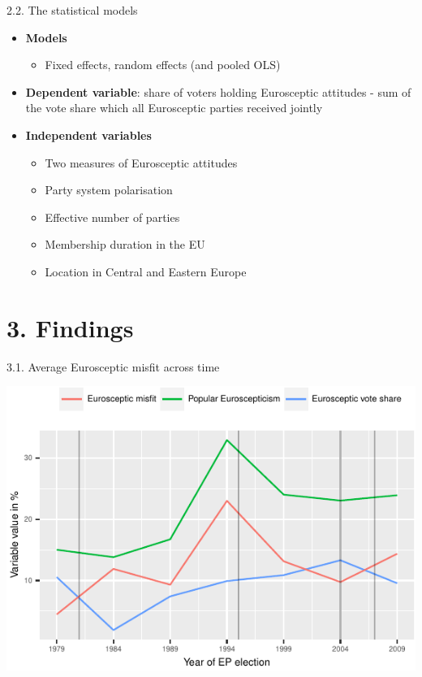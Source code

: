 \begin{frame}{2.2. The statistical models}

\begin{itemize}
\item
  \textbf{Models}

  \begin{itemize}
  \tightlist
  \item
    Fixed effects, random effects (and pooled OLS)
  \end{itemize}
\item
  \textbf{Dependent variable}: share of voters holding Eurosceptic
  attitudes - sum of the vote share which all Eurosceptic parties
  received jointly
\item
  \textbf{Independent variables}

  \begin{itemize}
  \tightlist
  \item
    Two measures of Eurosceptic attitudes
  \item
    Party system polarisation
  \item
    Effective number of parties
  \item
    Membership duration in the EU
  \item
    Location in Central and Eastern Europe
  \end{itemize}
\end{itemize}

\end{frame}

\section{3. Findings}\label{findings}

\begin{frame}{3.1. Average Eurosceptic misfit across time}

\begin{center}\includegraphics{graphs/graph-1} \end{center}

\end{frame}

